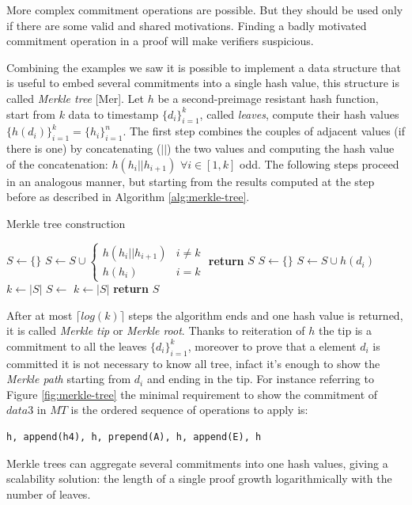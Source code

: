 More complex commitment operations are possible.
But they should be used only if there are some valid and shared motivations. Finding a badly motivated commitment operation in a proof will make verifiers suspicious.

Combining the examples we saw it is possible to implement a data structure that is useful to embed several commitments into a single hash value, 
this structure is called \textit{Merkle tree} [Mer]. Let $h$ be a second-preimage resistant hash function, start from $k$ data to timestamp $\{d_i\}_{i=1}^k$, called \textit{leaves}, compute their hash values $\{h(d_i)\}_{i=1}^k=\{h_i\}_{i=1}^n$. The first step combines the couples of adjacent values (if there is one) by concatenating ($||$) the two values and computing the hash value of the concatenation: $h(h_i||h_{i+1})$ $\forall i \in [1,k]$ odd. The following steps proceed in an analogous manner, but starting from the results computed at the step before as described in Algorithm \ref{alg:merkle-tree}. 

\begin{algorithm}
	\caption{Merkle tree construction}
	\label{alg:merkle-tree}
	\begin{algorithmic}[1]
		\State $S \gets \{\}$
		\State $S \gets S \cup \begin{cases} 
		h(h_i||h_{i+1}) & i \neq k \\ 
		h(h_i) & i=k           
		\end{cases}$
		\EndFor
		\State \textbf{return} $S$
		\EndProcedure
		\Statex
		 
		\State $S \gets \{\}$
		\State $S\gets S \cup h(d_i)$
		\EndFor
		\State $k\gets |S|$
		\State $S \gets$  
		\State $k\gets |S|$
		\EndWhile
		\State \textbf{return} $S$ 
		\EndProcedure
	\end{algorithmic}
\end{algorithm}

After at most $\lceil log(k) \rceil$ steps the algorithm ends and one hash value is returned, it is called \textit{Merkle tip} or \textit{Merkle root}. 
Thanks to reiteration of $h$ the tip is a commitment to all the leaves $\{d_i\}_{i=1}^k$, moreover to prove that a element $d_i$ is committed it is not necessary to know all tree, infact it's enough to show the \textit{Merkle path} starting from $d_i$ and ending in the tip. 
For instance referring to Figure \ref{fig:merkle-tree} the minimal requirement to show the commitment of $data3$ in $MT$ is the ordered sequence of operations to apply is:
\begin{verbatim}
h, append(h4), h, prepend(A), h, append(E), h
\end{verbatim}
Merkle trees can aggregate several commitments into one hash values, giving a scalability solution: the length of a single proof growth logarithmically with the number of leaves.

